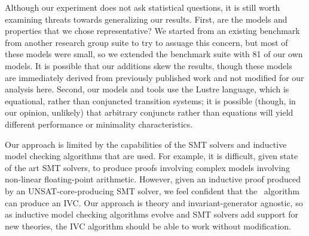 
Although our experiment does not ask statistical questions, it is still worth examining threats towards generalizing our results.  First, are the models and properties that we chose representative?  We started from an existing benchmark from another research group suite to try to assuage this concern, but most of these models were small, so we extended the benchmark suite with 81 of our own models.  It is possible that our additions skew the results, though these models are immediately derived from previously published work and not modified for our analysis here.  Second, our models and tools use the Lustre language, which is equational, rather than conjuncted transition systems; it is possible (though, in our opinion, unlikely) that arbitrary conjuncts rather than equations will yield different performance or minimality characteristics.

Our approach is limited by the capabilities of the SMT solvers and inductive model checking algorithms that are used.  For example, it is difficult, given state of the art SMT solvers, to produce proofs involving complex models involving non-linear floating-point arithmetic.  However, given an inductive proof produced by an UNSAT-core-producing SMT solver, we feel confident that the \ucalg\ algorithm can produce an IVC.  Our approach is theory and invariant-generator agnostic, so as inductive model checking algorithms evolve and SMT solvers add support for new theories, the IVC algorithm should be able to work without modification.

